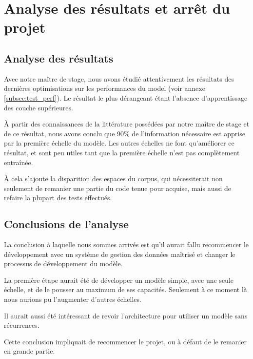 \section{Analyse des résultats et arrêt du projet}\label{white_flag}



\subsection{Analyse des résultats}
Avec notre maître de stage, nous avons étudié attentivement les résultats des dernières optimisations sur les performances du \gls{model} (voir annexe \ref{subsec:test_perf}). 
Le résultat le plus dérangeant étant l'absence d'apprentissage des couche supérieures.

À partir des connaissances de la littérature possédées par notre maître de stage et de ce résultat, nous avons conclu que 90\% de l'information nécessaire est apprise par la première échelle du modèle. Les autres échelles ne font qu'améliorer ce résultat, et sont peu utiles tant que la première échelle n'est pas complètement entraînée.

À cela s'ajoute la disparition des espaces du corpus, qui nécessiterait non seulement de remanier une partie du code tenue pour acquise, mais aussi de refaire la plupart des tests effectués.

\subsection{Conclusions de l'analyse}
La conclusion à laquelle nous sommes arrivés est qu'il aurait fallu recommencer le développement avec un système de gestion des données maîtrisé et changer le processus de développement du modèle.

La première étape aurait été de développer un modèle simple, avec une seule échelle, et de le pousser au maximum de ses capacités. Seulement à ce moment là nous aurions pu l'augmenter d'autres échelles.

Il aurait aussi été intéressant de revoir l'architecture pour utiliser un modèle sans récurrences.

Cette conclusion impliquait de recommencer le projet, ou à défaut de le remanier en grande partie.

